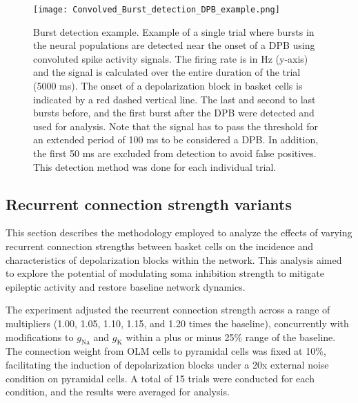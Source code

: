 \begin{figure}[htbp]
    \centering
    \texttt{[image: Convolved\_Burst\_detection\_DPB\_example.png]}
    \caption[Burst detection example]{Burst detection example. Example of a single trial where bursts in the neural populations are detected near the onset of a DPB using convoluted spike activity signals. The firing rate is in Hz (y-axis) and the signal is calculated over the entire duration of the trial (5000 ms).
    The onset of a depolarization block in basket cells is indicated by a red dashed vertical line. The last and second to last bursts before, and the first burst after the DPB were detected and used for analysis.
    Note that the signal has to pass the threshold for an extended period of 100 ms to be considered a DPB\@.
    In addition, the first 50 ms are excluded from detection to avoid false positives. This detection method was done for each individual trial.}\label{fig:example_burst_detection}
\end{figure}
\pagebreak

\subsection{Recurrent connection strength variants}
This section describes the methodology employed to analyze the effects of
varying recurrent connection strengths between basket cells on the incidence
and characteristics of depolarization blocks within the network. This analysis
aimed to explore the potential of modulating soma inhibition strength to
mitigate epileptic activity and restore baseline network dynamics.

The experiment adjusted the recurrent connection strength across a range of
multipliers (1.00, 1.05, 1.10, 1.15, and 1.20 times the baseline), concurrently
with modifications to \(g_{\text{Na}}\) and \(g_{\text{K}}\) within a plus or
minus 25\% range of the baseline. The connection weight from OLM cells to
pyramidal cells was fixed at 10\%, facilitating the induction of depolarization
blocks under a 20x external noise condition on pyramidal cells. A total of 15
trials were conducted for each condition, and the results were averaged for
analysis.

